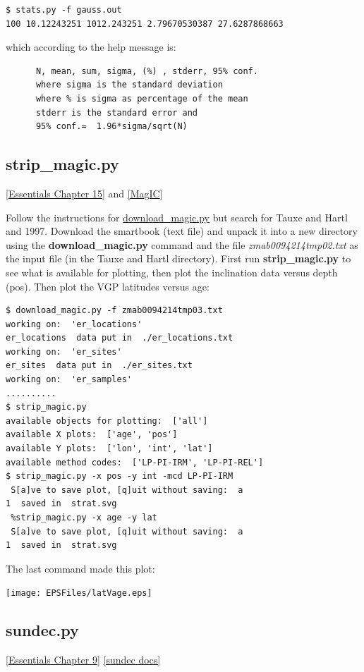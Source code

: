 \documentclass[11pt]{book}
\begin{document}
{{{\begin{verbatim}
$ stats.py -f gauss.out
100 10.12243251 1012.243251 2.79670530387 27.6287868663
\end{verbatim}

which according to the help message is:

\begin{verbatim}
      N, mean, sum, sigma, (%) , stderr, 95% conf.
      where sigma is the standard deviation
      where % is sigma as percentage of the mean
      stderr is the standard error and
      95% conf.=  1.96*sigma/sqrt(N)
\end{verbatim}


\subsection{strip\_magic.py}
\href{http://earthref.org/MAGIC/books/Tauxe/Essentials/WebBook3ch15.html#ch15}{[Essentials Chapter 15]} and \href{#MagIC}{[MagIC}]

Follow the instructions for \href{#download_magic.py}{download\_magic.py} but search for Tauxe and Hartl and 1997.  Download the smartbook (text file) and unpack it into a new directory using the {\bf download\_magic.py} command and the file {\it zmab0094214tmp02.txt} as the input file (in the Tauxe and Hartl directory).   First run {\bf strip\_magic.py} to see what is available for plotting, then
plot the inclination data versus depth (pos).  Then plot the VGP latitudes versus age:
\begin{verbatim}
$ download_magic.py -f zmab0094214tmp03.txt
working on:  'er_locations'
er_locations  data put in  ./er_locations.txt
working on:  'er_sites'
er_sites  data put in  ./er_sites.txt
working on:  'er_samples'
..........
$ strip_magic.py
available objects for plotting:  ['all']
available X plots:  ['age', 'pos']
available Y plots:  ['lon', 'int', 'lat']
available method codes:  ['LP-PI-IRM', 'LP-PI-REL']
$ strip_magic.py -x pos -y int -mcd LP-PI-IRM
 S[a]ve to save plot, [q]uit without saving:  a
1  saved in  strat.svg
 %strip_magic.py -x age -y lat
 S[a]ve to save plot, [q]uit without saving:  a
1  saved in  strat.svg
\end{verbatim}
The last command made this plot:


\texttt{[image: EPSFiles/latVage.eps]}



\subsection{sundec.py}
\href{http://earthref.org/MAGIC/books/Tauxe/Essentials/WebBook3ch9.html#ch9}{[Essentials Chapter 9]}
\href{https://github.com/PmagPy/PmagPy/blob/master/programs/sundec.py}{[sundec docs]}

}}}
\end{document}
